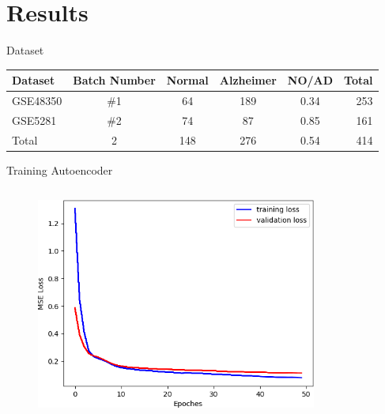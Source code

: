 \documentclass{beamer}
\begin{document}
\section{Results}
\begin{frame}{Dataset}
\begin{tabular}{lccccr}
  \toprule
  Dataset&Batch Number&Normal&Alzheimer&NO/AD&Total\\
  \midrule
  GSE48350&\#1&64&189&0.34&253\\
  GSE5281&\#2&74&87&0.85&161\\
  Total&2&148&276&0.54&414\\
  \bottomrule
\end{tabular}
\end{frame}
\begin{frame}{Training Autoencoder}
  \begin{columns}
    \begin{column}[t]{.48\textwidth}
      \begin{figure}[ht]
        \centering
        \includegraphics[width=1.0\textwidth,height=0.7\textheight]{figures/train_val_ae.png}
        \caption*{\label{fig:train-ae}}
      \end{figure}
    \end{column}
    \begin{column}[t]{.48\textwidth}
      \begin{figure}[ht]
        \centering

\end{figure}
\end{column}
\end{columns}
\end{frame}
\end{document}
